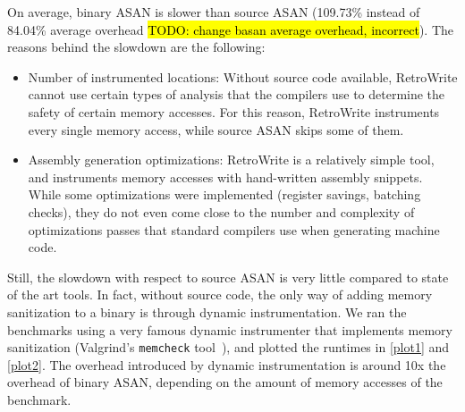\documentclass[a4paper,11pt,oneside]{report}
\newcommand{\sysname}{RetroWrite\xspace}
\DeclareRobustCommand{\todo}[1]{{\sethlcolor{cyan}\hl{TODO: #1}}}
\begin{document}
On average, binary ASAN is slower than source ASAN (109.73\% instead of 84.04\%
average overhead \todo{change basan average overhead, incorrect}). The reasons
behind the slowdown are the following:
\begin{itemize}
	\item Number of instrumented locations: Without source code available,
		\sysname cannot use certain types of analysis that the compilers use to 
		determine the safety of certain memory accesses. For this reason, \sysname
		instruments every single memory access, while source ASAN skips some of them.
	\item Assembly generation optimizations: \sysname is a relatively simple tool, 
		and instruments memory accesses with hand-written assembly snippets. While
		some optimizations were implemented (register savings, batching checks), they
		do not even come close to the number and complexity of optimizations passes that
		standard compilers use when generating machine code. 
\end{itemize}
Still, the slowdown with respect to source ASAN is very little compared to
state of the art tools.  In fact, without source code, the only way of adding
memory sanitization to a binary is through dynamic instrumentation. We ran the
benchmarks using a very famous dynamic instrumenter that implements memory
sanitization (Valgrind's \texttt{memcheck} tool~\cite{valgrind}), and plotted
the runtimes in \autoref{plot1} and \autoref{plot2}. The overhead introduced by
dynamic instrumentation is around 10x the overhead of binary ASAN, depending on
the amount of memory accesses of the benchmark. 
\end{document}
